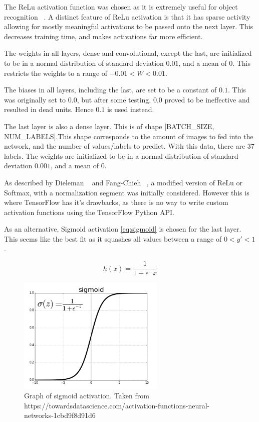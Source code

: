 \documentclass[12pt,a4paper,oneside,oldfontcommands]{memoir}
\begin{document}
\begin{Declaration Of OriginalityOrginality}
The ReLu activation function was chosen as it is extremely useful for object recognition ~\cite{ReLu}. A distinct feature of ReLu activation is that it has sparse activity allowing for mostly meaningful activations to be passed onto the next layer. This decreases training time, and makes activations far more efficient.

The weights in all layers, dense and convolutional, except the last, are initialized to be in a normal distribution of standard deviation \(0.01\), and a mean of \(0\). This restricts the weights to a range of \(-0.01 < W < 0.01\). 

The biases in all layers, including the last, are set to be a constant of \(0.1\). This was originally set to \(0.0\), but after some testing, \(0.0\) proved to be ineffective and resulted in dead units. Hence \(0.1\) is used instead.

The last layer is also a dense layer. This is of shape [BATCH\_SIZE, NUM\_LABELS].This shape corresponds to the amount of images to fed into the network, and the number of values/labels to predict. With this data, there are \(37\) labels.  The weights are initialized to be in a normal distribution of standard deviation \(0.001\), and a mean of \(0\). 

As described by Dieleman ~\cite{Sanders-GZ} and Fang-Chieh ~\cite{Fang}, a modified version of ReLu or Softmax, with a normalization segment was initially considered. However this is where TensorFlow has it's drawbacks, as there is no way to write custom activation functions using the TensorFlow Python API.

As an alternative, Sigmoid activation \ref{eq:sigmoid} is chosen for the last layer. This seems like the best fit as it squashes all values between a range of \(0 < y' < 1\).

\begin{equation}
    h(x) =  \frac{\mathrm{1} }{\mathrm{1} + e^-x }
    \label{eq:sigmoid}
\end{equation}

\begin{figure}[H]
  \centering
    \includegraphics[width=7cm]{images/sigmoid.png}
    \caption{Graph of sigmoid activation. Taken from https://towardsdatascience.com/activation-functions-neural-networks-1cbd9f8d91d6}
    \label{fig:sigmoid_graph}
\end{figure}


\end{Declaration Of OriginalityOrginality}
\end{document}
